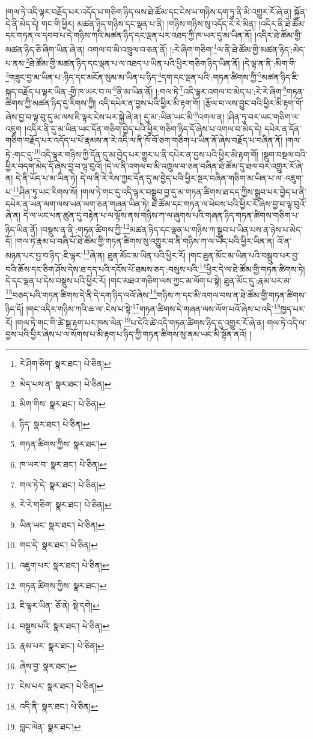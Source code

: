 །གལ་ཏེ་འདི་ལྟར་བརྗོད་པར་འདོད་པ་གཅིག་ཉིད་ལས་ཐེ་ཚོམ་དང་ངེས་པ་གཉིས་དག་ཏུ་ནི་མི་འགྱུར་རོ་ཞེ་ན། སྐྱོན་དེ་ནི་མེད་དེ། གང་གི་ཕྱིར། མཚན་ཉིད་གཉིས་དང་ལྡན་པ་ནི། །གཉིས་གཉིས་སུ་འདོད་རེ་རེ་མིན། །འདིར་ནི་ཐེ་ཚོམ་དང་གཏན་ལ་དབབ་པ་དེ་གཉིས་ཀའི་མཚན་ཉིད་དང་ལྡན་པར་འཐད་ཀྱི་ཁ་ཡར་དུ་མ་ཡིན་ནོ། །འདིར་ཐེ་ཚོམ་གྱི་མཚན་ཉིད་ཅི་ཞིག་ཡིན་ཞེ་ན། འགལ་བ་མི་འཁྲུལ་བ་ཅན་ནོ། །:རེ་ཞིག་གཅིག་\footnote{རེ་ཤིག་ཅིག་  སྣར་ཐང་།  པེ་ཅིན། }ལ་ནི་ཐེ་ཚོམ་གྱི་མཚན་ཉིད་:མེད་པ་ནས་\footnote{མེད་པས་ན་  སྣར་ཐང་།  པེ་ཅིན། }ཐེ་ཚོམ་གྱི་མཚན་ཉིད་དང་ལྡན་པ་ལ་འཐད་པ་ཡིན་པའི་ཕྱིར་གཅིག་ཉིད་ཡིན་ནོ། །དེ་ལྟ་ན་ནི་:མིག་གི་\footnote{མིག་གིས་  སྣར་ཐང་།  པེ་ཅིན། }གཟུང་བྱ་མ་ཡིན་པ་:ཉིད་དང་མངོན་སུམ་མ་ཡིན་པ་ཉིད་\footnote{ཉིད་  སྣར་ཐང་།  པེ་ཅིན། }དག་དང་ལྡན་པའི་:གཏན་ཚིགས་ཀྱི་\footnote{གཏན་ཚིགས་ཀྱིས་  སྣར་ཐང་། }མཚན་ཉིད་ཇི་སྐད་བརྗོད་པ་ལྟར་ཡིན་:གྱི་ཁ་ཡར་བ་ལ་\footnote{ཁ་ཡར་བ་  སྣར་ཐང་།  པེ་ཅིན། }ནི་མ་ཡིན་ནོ། །:གལ་ཏེ་\footnote{གལ་ཏེ་དེ་  སྣར་ཐང་།  པེ་ཅིན། }འདི་ལྟར་འགལ་བ་མེད་པ་:རེ་རེ་ཞིག་\footnote{རེ་རེ་གཅིག་  སྣར་ཐང་།  པེ་ཅིན། }གཏན་ཚིགས་ཀྱི་མཚན་ཉིད་དུ་རིགས་ཀྱི། འདི་དཔེར་ན་བྱས་པའི་ཕྱིར་མི་རྟག་གོ། །རྩོལ་བ་ལས་བྱུང་བའི་ཕྱིར་མི་རྟག་གོ་ཞེས་བྱ་བ་ལྟ་བུ་དུ་མ་ལས་ཇི་ལྟར་ངེས་པར་སྐྱེ་ཞེ་ན། དུ་མ་:ཡིན་ཡང་མི་\footnote{ཡིན་ཡང་  སྣར་ཐང་།  པེ་ཅིན། }འགལ་ན། །ཤིན་ཏུ་བར་ཡང་གཅིག་ལ་འཇུག །འདིར་ནི་དུ་མ་ཡིན་ཡང་དོན་གཅིག་བྱེད་པའི་ཕྱིར་གཅིག་ཉིད་དོ་ཞེས་པ་འགལ་བ་མེད་དེ། དཔེར་ན་དོན་གཅིག་བརྗོད་པར་འདོད་པ་པོ་རྣམས་ན་རེ་འདི་ལ་ནི་ཁོ་བོ་ཅག་གཅིག་པ་ཡིན་ནོ་ཞེས་བརྗོད་པ་བཞིན་ནོ། །གལ་ཏེ་:གང་དུ་\footnote{གང་དེ་  སྣར་ཐང་།  པེ་ཅིན། }འདི་ལྟར་གཉིས་ཀྱི་དོན་དུ་མ་བྱེད་པར་གྱུར་པ་ནི་དཔེར་ན་བྱས་པའི་ཕྱིར་མི་རྟག་གོ། །སྡུག་བསྔལ་བའི་ཕྱིར་བདག་མེད་དོ་ཞེས་བྱ་བ་ལྟ་བུའོ། །དེ་ལ་ནི་འགལ་བ་མི་འཁྲུལ་བ་ཅན་བཞིན་ཐེ་ཚོམ་དུ་ཐལ་བར་འགྱུར་རོ་ཞེ་ན། དེ་ནི་ཡོད་པ་མ་ཡིན་ཏེ། དེ་ལ་ནི་རེ་རེས་ཀྱང་དོན་དུ་མ་བྱེད་པའི་ཕྱིར་སྔར་བཞིན་གཅིག་མ་ཡིན་པ་ལ་:འཇུག་པ་\footnote{འཇུག་པར་  སྣར་ཐང་།  པེ་ཅིན། }ཤིན་ཏུ་ཡང་རིགས་སོ། །གལ་ཏེ་གང་དུ་འདི་ལྟར་བསྒྲུབ་བྱ་དུ་མ་གཏན་ཚིགས་ཐ་དད་ཀྱིས་སྒྲུབ་པར་བྱེད་པ་ནི་དཔེར་ན་ཡན་ལག་ལས་ཡན་ལག་ཅན་གཞན་ཡིན་ཏེ། ཐེ་ཚོམ་དང་གཏན་ལ་ཕེབས་པའི་ཕྱིར་རོ་ཞེས་བྱ་བ་ལྟ་བུའོ་ཞེ་ན། དེ་ལ་ཡང་ཕན་ཚུན་དུ་བརྟེན་པ་ལ་ལྟོས་ནས་གཉིས་ཀ་ལ་ཞུགས་པའི་གཞན་ཉིད་གཏན་ཚིགས་གཅིག་པ་ཉིད་ཡིན་ནོ། །བསྡུས་ན་ནི་:གཏན་ཚིགས་ཀྱི་\footnote{གཏན་ཚིགས་ཀྱིས་  སྣར་ཐང་། }མཚན་ཉིད་དང་ལྡན་པ་གཉིས་ཀ་སྒྲུབ་པ་ཡིན་པས་ན་ཉེས་པ་མེད་དོ། །གལ་ཏེ་རྣམ་པ་བཞི་པོ་ཐེ་ཚོམ་གྱི་གཏན་ཚིགས་སུ་འགྱུར་བ་ནི་གཉིས་ཀ་ལ་ཡོད་པའི་ཕྱིར་ཡིན་ན། འོ་ན་མཉན་པར་བྱ་བ་ཉིད་:ཇི་ལྟར་\footnote{ཇི་ལྟར་ཡིན་  ཅོ་ནེ།  སྡེ་དགེ། }ཞེ་ན། ཐུན་མོང་མ་ཡིན་པའི་ཕྱིར་རོ། །གང་ཐུན་མོང་མ་ཡིན་པའི་བསྒྲུབ་པར་བྱ་བའི་ཆོས་དང་ཅིག་ཤོས་དེས་ཐ་དད་པའི་དངོས་པོ་ཐམས་ཅད་:བསུས་པའི་\footnote{བསྡུས་པའི་  སྣར་ཐང་།  པེ་ཅིན། }ཕྱིར་དེ་ལ་ཐེ་ཚོམ་གྱི་གཏན་ཚིགས་ཏེ། དེ་དང་ལྡན་པ་དེས་བསྡུས་པའི་ཕྱིར་རོ། །གང་མཐའ་གཅིག་ལས་ཀྱང་མ་ལོག་པ་སྟེ། ཐུན་མོང་དུ་:རྣམ་པར་མ་\footnote{རྣམ་པར་  སྣར་ཐང་།  པེ་ཅིན། }བཅད་པའི་གཏན་ཚིགས་དེ་ནི་དེ་དག་ཉིད་ལའོ་ཞེས་\footnote{ཞེས་བྱ་  སྣར་ཐང་། }གཉིས་ཀ་དང་མི་འགལ་བས་ན་ཐེ་ཚོམ་གྱི་གཏན་ཚིགས་ཉིད་དོ། །གང་འདིར་གཉིས་ཀའི་ཆ་ལ་:ངེས་པ་སྟེ་\footnote{ངེས་པར་  སྣར་ཐང་།  པེ་ཅིན། }གཏན་ཚིགས་དེ་གཞན་ལས་ལོག་པའོ་ཞེས་པ་འདི་\footnote{འདི་ནི་  སྣར་ཐང་།  པེ་ཅིན། }ཁྱད་པར་རོ། །གལ་ཏེ་གང་གི་ཚེ་སྒྲ་རྟག་པར་ཁས་ལེན་\footnote{བླང་ལེན་  སྣར་ཐང་། }པ་དེའི་ཚེ་འདི་གཏན་ཚིགས་ཉིད་དུ་འགྱུར་རོ་ཞེ་ན། གལ་ཏེ་འདི་ལ་བྱས་པའི་ཕྱིར་ཞེས་པ་ལ་སོགས་པ་མི་རྟག་པ་ཉིད་ཀྱི་གཏན་ཚིགས་སུ་ནམ་ཡང་མི་སྟོན་ནའོ། །
